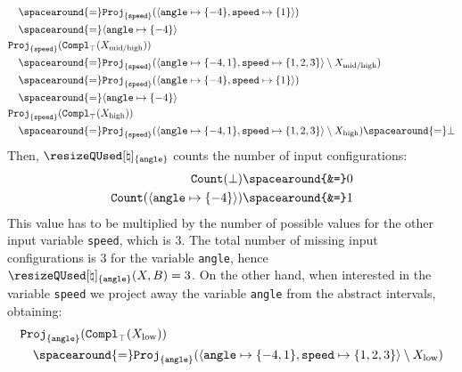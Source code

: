 \begin{example}
\begin{align*}
    &\quad\spacearound{=} \abstractdomainproject[{\{\texttt{speed}\}}](\langle \texttt{angle} \mapsto \{-4\}, \texttt{speed} \mapsto \{1\}\rangle) \\
    &\quad\spacearound{=} \langle \texttt{angle} \mapsto \{-4\} \rangle \\
    &\abstractdomainproject[{\{\texttt{speed}\}}](\abstractdomaincomplement_\abstractdomaintop(\prefrombucket[\textup{mid\-/high}])) \\
    &\quad\spacearound{=} \abstractdomainproject[{\{\texttt{speed}\}}](\langle \texttt{angle} \mapsto \{-4, 1\}, \texttt{speed} \mapsto \{1, 2, 3\} \rangle \setminus \prefrombucket[\textup{mid\-/high}]) \\
    &\quad\spacearound{=} \abstractdomainproject[{\{\texttt{speed}\}}](\langle \texttt{angle} \mapsto \{-4\}, \texttt{speed} \mapsto \{1\}\rangle) \\
    &\quad\spacearound{=} \langle \texttt{angle} \mapsto \{-4\} \rangle \\
    &\abstractdomainproject[{\{\texttt{speed}\}}](\abstractdomaincomplement_\abstractdomaintop(\prefrombucket[\textup{high}])) \\
    &\quad\spacearound{=} \abstractdomainproject[{\{\texttt{speed}\}}](\langle \texttt{angle} \mapsto \{-4, 1\}, \texttt{speed} \mapsto \{1, 2, 3\} \rangle \setminus \prefrombucket[\textup{high}]) \spacearound{=} \abstractdomainbottom
  \end{align*}
  Then, $\abstractqusedname_{\{\texttt{angle}\}}$ counts the number of input configurations:
  \begin{align*}
    \abstractdomaincount(\abstractdomainbottom) \spacearound{&=} 0 \\
    \abstractdomaincount(\langle \texttt{angle} \mapsto \{-4\} \rangle) \spacearound{&=} 1
  \end{align*}
  This value has to be multiplied by the number of possible values for the other input variable \texttt{speed}, which is $3$.
  The total number of missing input configurations is $3$ for the variable \texttt{angle}, hence $\abstractqusedname_{\{\texttt{angle}\}}(\presfrombuckets, \buckets) = 3$.
  On the other hand, when interested in the variable \texttt{speed} we project away the variable \texttt{angle} from the abstract intervals, obtaining:
  \begin{align*}
    &\abstractdomainproject[{\{\texttt{angle}\}}](\abstractdomaincomplement_\abstractdomaintop(\prefrombucket[\textup{low}])) \\
    &\quad\spacearound{=} \abstractdomainproject[{\{\texttt{angle}\}}](\langle \texttt{angle} \mapsto \{-4, 1\}, \texttt{speed} \mapsto \{1, 2, 3\} \rangle \setminus \prefrombucket[\textup{low}]) \\

\end{align*}
\end{example}
